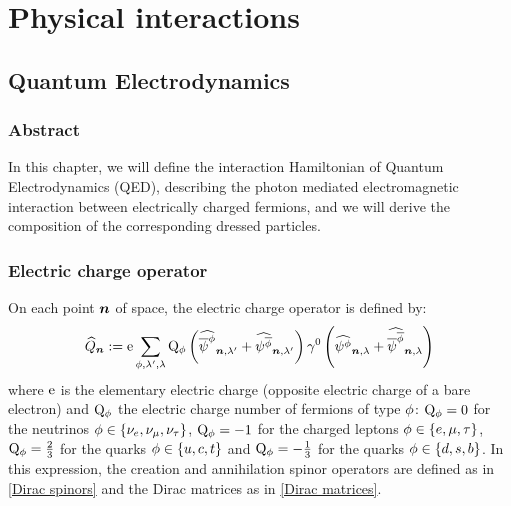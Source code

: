 \documentclass[10pt,a4paper,twoside,openany]{book}
\begin{document}



\part{Physical interactions}

\chapter{Quantum Electrodynamics}
\label{Quantum Electrodynamics}

\section{Abstract}

In this chapter, we will define the interaction Hamiltonian of Quantum Electrodynamics (QED), describing the photon mediated electromagnetic interaction between electrically charged fermions, and we will derive the composition of the corresponding dressed particles.

\section{Electric charge operator}
\label{Electric charge operator}

On each point $\boldsymbol{n}$ of space, the electric charge operator is defined by:
\begin{equation*}
\widehat{Q}_{\boldsymbol{n}} := \mathrm e \sum_{\phi,\lambda',\lambda} \mathrm Q_{\phi} \left( \widehat{\overline \psi^{\phi}}_{{\boldsymbol{n}}, {\lambda'}} + \widehat{\psi^{\overline{\phi}}}_{{\boldsymbol{n}}, {\lambda'}} \right) \gamma^{0} \left( \widehat{\psi^{\phi}}_{{\boldsymbol{n}}, {\lambda}} + \widehat{\overline \psi^{\overline{\phi}}}_{{\boldsymbol{n}}, {\lambda}} \right)
\end{equation*}
where $\mathrm e$ is the elementary electric charge (opposite electric charge of a bare electron) and $\mathrm Q_{\phi}$ the electric charge number of fermions of type $\phi$: $\mathrm Q_{\phi} = 0$ for the neutrinos $\phi \in \{ \nu_{e}, \nu_{\mu}, \nu_{\tau} \}$, $\mathrm Q_{\phi} = -1$ for the charged leptons $\phi \in \{ e, \mu, \tau \}$, $\mathrm Q_{\phi} = \frac 2 3$ for the quarks $\phi \in \{ u, c, t \}$ and $\mathrm Q_{\phi} = - \frac 1 3$ for the quarks $\phi \in \{ d, s, b \}$. In this expression, the creation and annihilation spinor operators are defined as in \ref{Dirac spinors} and the Dirac matrices as in \ref{Dirac matrices}.
\end{document}
